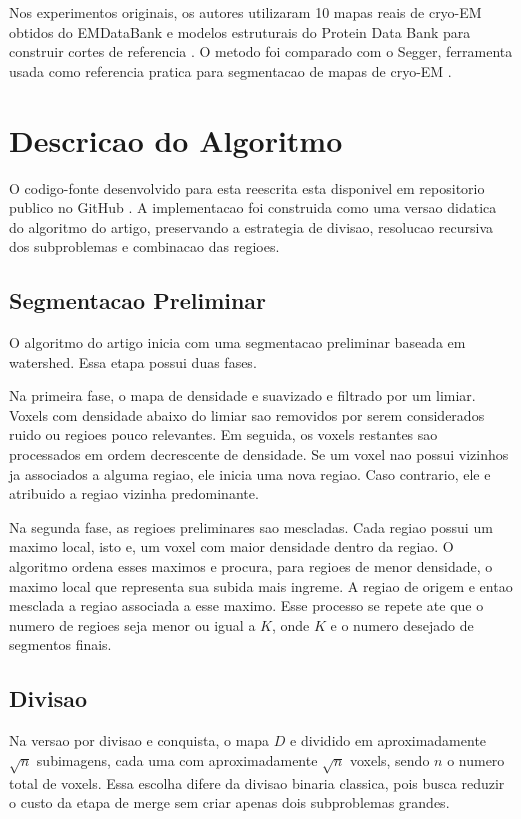 \documentclass[tcc1]{uftex}
\begin{document}
Nos experimentos originais, os autores utilizaram 10 mapas reais de cryo-EM obtidos do EMDataBank e modelos estruturais do Protein Data Bank para construir cortes de referencia \cite{emdb,berman2000pdb}. O metodo foi comparado com o Segger, ferramenta usada como referencia pratica para segmentacao de mapas de cryo-EM \cite{pintilie2010segger}.

\chapter{Descricao do Algoritmo}

O codigo-fonte desenvolvido para esta reescrita esta disponivel em repositorio publico no GitHub \cite{arruda2026paa}. A implementacao foi construida como uma versao didatica do algoritmo do artigo, preservando a estrategia de divisao, resolucao recursiva dos subproblemas e combinacao das regioes.

\section{Segmentacao Preliminar}

O algoritmo do artigo inicia com uma segmentacao preliminar baseada em watershed. Essa etapa possui duas fases.

Na primeira fase, o mapa de densidade e suavizado e filtrado por um limiar. Voxels com densidade abaixo do limiar sao removidos por serem considerados ruido ou regioes pouco relevantes. Em seguida, os voxels restantes sao processados em ordem decrescente de densidade. Se um voxel nao possui vizinhos ja associados a alguma regiao, ele inicia uma nova regiao. Caso contrario, ele e atribuido a regiao vizinha predominante.

Na segunda fase, as regioes preliminares sao mescladas. Cada regiao possui um maximo local, isto e, um voxel com maior densidade dentro da regiao. O algoritmo ordena esses maximos e procura, para regioes de menor densidade, o maximo local que representa sua subida mais ingreme. A regiao de origem e entao mesclada a regiao associada a esse maximo. Esse processo se repete ate que o numero de regioes seja menor ou igual a $K$, onde $K$ e o numero desejado de segmentos finais.

\section{Divisao}

Na versao por divisao e conquista, o mapa $D$ e dividido em aproximadamente $\sqrt{n}$ subimagens, cada uma com aproximadamente $\sqrt{n}$ voxels, sendo $n$ o numero total de voxels. Essa escolha difere da divisao binaria classica, pois busca reduzir o custo da etapa de merge sem criar apenas dois subproblemas grandes.
\end{document}
